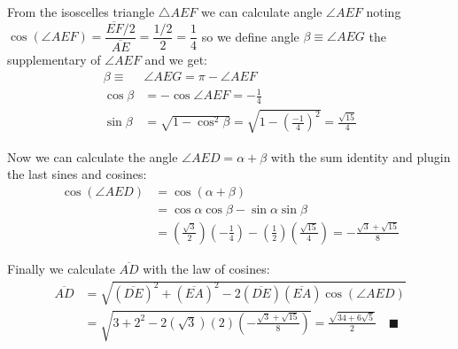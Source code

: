 \documentclass[11pt]{article}
\begin{document}
From the isoscelles triangle $\triangle{AEF}$ we can calculate angle $\angle{AEF}$ noting $\cos(\angle{AEF}) = \dfrac{\overline{EF}/2}{\overline{AE}} = \dfrac{1/2}{2} = \dfrac{1}4$ so we define angle $\beta \equiv \angle{AEG}$ the supplementary of $\angle{AEF}$ and we get:
\begin{align}
\beta \equiv& \angle{AEG} = \pi - \angle{AEF} \nonumber\\
\cos\beta &= -\cos{\angle{AEF}} = -\frac{1}4 \\
\sin\beta &= \sqrt{1 - \cos^2\beta} = \sqrt{1 - \left(\frac{-1}4\right)^2} = \frac{\sqrt{15}}4
\end{align}

Now we can calculate the angle $\angle{AED} = \alpha + \beta$ with the sum identity and plugin the last sines and cosines:
\begin{align}
\cos(\angle{AED}) &= \cos(\alpha + \beta) \nonumber\\
 &= \cos\alpha\cos\beta - \sin\alpha\sin\beta \nonumber\\
 & = \left(\frac{\sqrt3}2\right)\left(-\frac{1}4\right) 
  - \left(\frac{1}2\right)\left(\frac{\sqrt{15}}4\right) 
  = -\frac{\sqrt3 + \sqrt{15}}8
\end{align}

Finally we calculate $\overline{AD}$ with the law of cosines:
\begin{align}
\overline{AD} &= \sqrt{(\overline{DE})^2 + (\overline{EA})^2 
 - 2(\overline{DE})(\overline{EA})\cos(\angle{AED})} \nonumber\\
 &= \sqrt{3 + 2^2 - 2(\sqrt3)(2)\left(-\frac{\sqrt3 + \sqrt{15}}8\right)} 
 = \frac{\sqrt{34 + 6\sqrt5}}2 \quad\blacksquare
\end{align}
\end{document}

